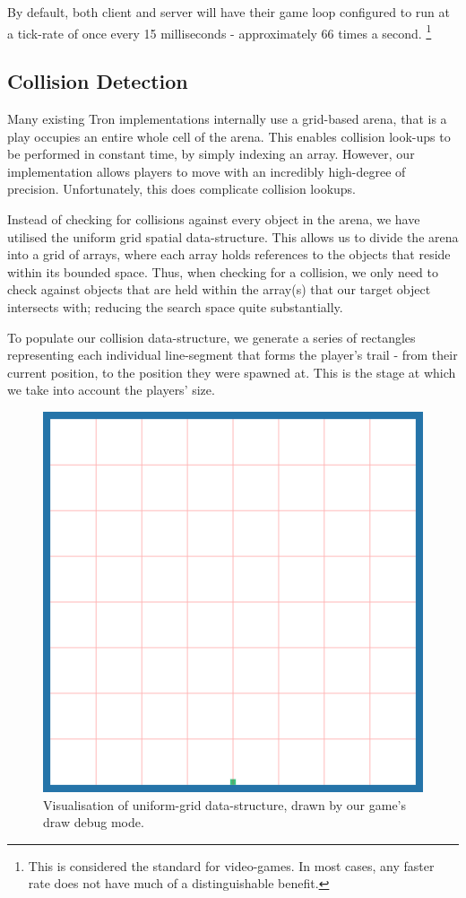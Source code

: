 \documentclass{standalone}
\begin{document}
		By default, both client and server will have their game loop configured to run at a tick-rate of once every 15 milliseconds - approximately 66 times a second. \footnote{This is considered the standard for video-games. In most cases, any faster rate does not have much of a distinguishable benefit.}

		\subsection{Collision Detection} \label{collisionDetection}
			Many existing Tron implementations internally use a grid-based arena, that is a play occupies an entire whole cell of the arena. This enables collision look-ups to be performed in constant time, by simply indexing an array. However, our implementation allows players to move with an incredibly high-degree of precision\parencite{JsNumbers}. Unfortunately, this does complicate collision lookups.

			Instead of checking for collisions against every object in the arena, we have utilised the uniform grid spatial data-structure. This allows us to divide the arena into a grid of arrays, where each array holds references to the objects that reside within its bounded space. Thus, when checking for a collision, we only need to check against objects that are held within the array(s) that our target object intersects with; reducing the search space quite substantially.

			To populate our collision data-structure, we generate a series of rectangles representing each individual line-segment that forms the player's trail - from their current position, to the position they were spawned at. This is the stage at which we take into account the players' size.

			\begin{figure}[!htbp]
				\centering
				\includegraphics[width=.8\textwidth]{resources/images/uniformgrid.png}
				\caption{Visualisation of uniform-grid data-structure, drawn by our game's draw debug mode.}
			\end{figure}
			\FloatBarrier
\end{document}
